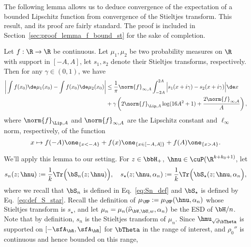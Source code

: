 The following lemma allows us to deduce convergence of the expectation of a bounded Lipschitz function from convergence of the Stieltjes transform. This result, and its proof are fairly standard. The proof is included in Section~\ref{sec:proof_lemma_f_bound_st} for the sake of completion.
\begin{lemma}
\label{lemma:f_bound_st}
Let $f:\R\to\R$ be continuous. Let $\mu_1,\mu_2$ be two probability measures on $\R$ with support in $[-A,A]$, let $s_1,s_2$ denote their Stieltjes transforms, respectively.
Then for any $\gamma \in (0,1)$, we have
    \begin{align*}
         \bigg|\int f(x_0)\de\mu_1(x_0) - \int f(x_0)\de\mu_2(x_0)\bigg| &\le
        \frac1\pi \norm{f}_{\infty,A} \int_{-2A}^{2A} \Big|s_1(x+i\gamma)-s_2(x+i\gamma)\Big|\de x\\
&+
\gamma\left(
2\norm{f}_{\Lip,A} \log(16 A^2+ 1)
        + \frac{2 \norm{f}_{\infty,A}}{A}\right),
     \end{align*}
where $\norm{f}_{\Lip,A}$ and $\norm{f}_{\infty,A}$ are the Lipschitz constant and $\ell_\infty$ norm, respectively, of the function 
$$x \mapsto f(-A)\one_{\{x < -A\}} + f(x)\one_{\{x\in[-A,A]\}} +  f(A)\one_{\{x > A\}}.$$
\end{lemma}
We'll apply this lemma to our setting. 
For $z\in\bbH_+$, $\hnu\in\cuP(\R^{k+k_0+1)}$, let
\begin{equation}
    s_n(z;\hnu) := \frac1k \Tr\Big( \bS_n(z; \hnu)\Big),\quad
    s_\star(z ;\hnu, \alpha_n) := \frac1k \Tr\Big( \bS_\star(z; \hnu, \alpha_n\Big),
\end{equation}
%
where we recall that $\bS_n$ is 
defined in Eq.~\eqref{eq:Sn_def} and
$\bS_{\star}$ is 
defined by Eq.~\eqref{eq:def_S_star}. 
Recall the definition of $\mu_{\MP} := \mu_{\MP}(\hnu,\alpha_n)$ whose Stieltjes transform is $s_\star$, and let $\mu_n = \mu_n(\widehat \nu_{\bV,\bU,w}, \alpha_n)$ be the ESD of $\bH/n$. Note that by definition, $s_n$ is the Stieltjes transform of $\mu_n$.
Since $\hmu_{\sqrt{d}\bTheta}$ is supported on $[-\sfA_\bR,\sfA_\bR]$ for $\bTheta$ in the range of interest, and $\rho_0''$ is continuous and hence bounded on this range,
